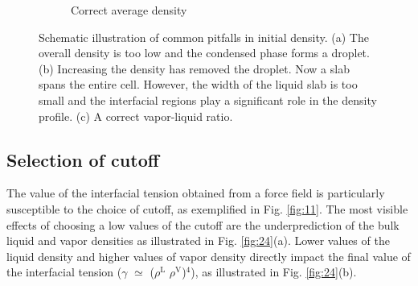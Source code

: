 \documentclass[9pt,bestpractices]{livecoms}
\begin{document}
\begin{figure}
\begin{subfigure}{0.3\textwidth}
    \caption{Correct average density}
	\end{subfigure}
  \caption{Schematic illustration of common pitfalls in initial density. (a) The overall density is too low
           and the condensed phase forms a droplet. (b) Increasing the density has removed the droplet.
           Now a slab spans the entire cell. However, the width of the liquid slab is too small and the
           interfacial regions play a significant role in the density profile. (c) A correct vapor-liquid ratio.}
\label{fig:23}
\end{figure}

\subsection{Selection of cutoff}

The value of the interfacial tension obtained from a force field is
particularly susceptible to the choice of cutoff, as exemplified in Fig. \ref{fig:11}.
The most visible effects of choosing a low values of the cutoff are the 
underprediction of the bulk liquid and vapor densities as illustrated in
Fig. \ref{fig:24}(a). Lower values of the liquid density
and higher values of vapor density directly impact the final value of the
interfacial tension ({${\gamma}$}  ${\simeq}$ (${\rho}$$^{\mathrm{L}}$
\textendash{} ${\rho}$$^{\mathrm{V}}$)$^{4}$), as illustrated in Fig. \ref{fig:24}(b).
\end{document}
